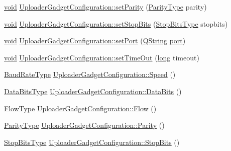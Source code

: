 \begin{DoxyCompactItemize}
\item 
\hyperlink{group___u_a_v_objects_plugin_ga444cf2ff3f0ecbe028adce838d373f5c}{void} \hyperlink{group___y_modem_uploader_ga842e10f0bd593c16293486664f0892bd}{Uploader\-Gadget\-Configuration\-::set\-Parity} (\hyperlink{qextserialport_8h_aee22d32d87c815090354bf9b8e957ace}{Parity\-Type} parity)
\item 
\hyperlink{group___u_a_v_objects_plugin_ga444cf2ff3f0ecbe028adce838d373f5c}{void} \hyperlink{group___y_modem_uploader_ga4207c9c91330ae30a22867c428ade5e5}{Uploader\-Gadget\-Configuration\-::set\-Stop\-Bits} (\hyperlink{qextserialport_8h_adc8078895cd941d755d46633b54d3e7f}{Stop\-Bits\-Type} stopbits)
\item 
\hyperlink{group___u_a_v_objects_plugin_ga444cf2ff3f0ecbe028adce838d373f5c}{void} \hyperlink{group___y_modem_uploader_gae74e20b5d71cdb225b581729bda7ef38}{Uploader\-Gadget\-Configuration\-::set\-Port} (\hyperlink{group___u_a_v_objects_plugin_gab9d252f49c333c94a72f97ce3105a32d}{Q\-String} \hyperlink{classport}{port})
\item 
\hyperlink{group___u_a_v_objects_plugin_ga444cf2ff3f0ecbe028adce838d373f5c}{void} \hyperlink{group___y_modem_uploader_ga4d3805496006d3cfdd8d1665d2b11654}{Uploader\-Gadget\-Configuration\-::set\-Time\-Out} (\hyperlink{ioapi_8h_a3c7b35ad9dab18b8310343c201f7b27e}{long} timeout)
\item 
\hyperlink{qextserialport_8h_a6f031169a6a9b150b5af707bb23cf010}{Baud\-Rate\-Type} \hyperlink{group___y_modem_uploader_ga3cd2d8faf40a9fcb60022843bf36171d}{Uploader\-Gadget\-Configuration\-::\-Speed} ()
\item 
\hyperlink{qextserialport_8h_a189ef78c2c1b7537ab114d576f6214fa}{Data\-Bits\-Type} \hyperlink{group___y_modem_uploader_ga3bf92d26250fea27e32f58eaf761c9d7}{Uploader\-Gadget\-Configuration\-::\-Data\-Bits} ()
\item 
\hyperlink{qextserialport_8h_a02ad1c7cf791a069dd54e409f8db4790}{Flow\-Type} \hyperlink{group___y_modem_uploader_gac453b5e5875eeb4c1ded9a780608a188}{Uploader\-Gadget\-Configuration\-::\-Flow} ()
\item 
\hyperlink{qextserialport_8h_aee22d32d87c815090354bf9b8e957ace}{Parity\-Type} \hyperlink{group___y_modem_uploader_gabdb93d527f297834e083e424edf4843c}{Uploader\-Gadget\-Configuration\-::\-Parity} ()
\item 
\hyperlink{qextserialport_8h_adc8078895cd941d755d46633b54d3e7f}{Stop\-Bits\-Type} \hyperlink{group___y_modem_uploader_ga8f7d119b9f954ce05995540ca957568c}{Uploader\-Gadget\-Configuration\-::\-Stop\-Bits} ()

\end{DoxyCompactItemize}
